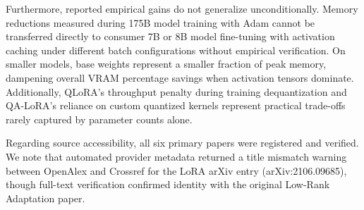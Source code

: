 \documentclass[11pt,a4paper]{article}
\begin{document}
Furthermore, reported empirical gains do not generalize unconditionally. Memory reductions measured during 175B model training with Adam cannot be transferred directly to consumer 7B or 8B model fine-tuning with activation caching under different batch configurations without empirical verification. On smaller models, base weights represent a smaller fraction of peak memory, dampening overall VRAM percentage savings when activation tensors dominate. Additionally, QLoRA's throughput penalty during training dequantization and QA-LoRA's reliance on custom quantized kernels represent practical trade-offs rarely captured by parameter counts alone.

Regarding source accessibility, all six primary papers were registered and verified. We note that automated provider metadata returned a title mismatch warning between OpenAlex and Crossref for the LoRA arXiv entry (arXiv:2106.09685), though full-text verification confirmed identity with the original Low-Rank Adaptation paper.



\end{document}
